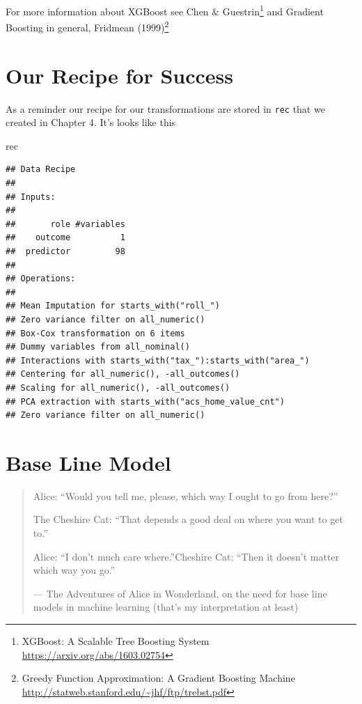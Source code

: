 \documentclass[]{book}
\newenvironment{Shaded}{\begin{snugshade}}{\end{snugshade}}
\newcommand{\NormalTok}[1]{#1}
\let\rmarkdownfootnote\footnote%
\def\footnote{\protect\rmarkdownfootnote}
\theoremstyle{definition}
\theoremstyle{definition}
\theoremstyle{definition}
\theoremstyle{remark}
\begin{document}
For more information about XGBoost see Chen \& Guestrin\footnote{XGBoost:
  A Scalable Tree Boosting System \url{https://arxiv.org/abs/1603.02754}}
and Gradient Boosting in general, Fridmean (1999)\footnote{Greedy
  Function Approximation: A Gradient Boosting Machine
  \url{http://statweb.stanford.edu/~jhf/ftp/trebst.pdf}}

\section{Our Recipe for Success}\label{our-recipe-for-success}

As a reminder our recipe for our transformations are stored in
\texttt{rec} that we created in Chapter 4. It's looks like this

\begin{Shaded}
\begin{Highlighting}[]
\NormalTok{rec}
\end{Highlighting}
\end{Shaded}

\begin{verbatim}
## Data Recipe
## 
## Inputs:
## 
##       role #variables
##    outcome          1
##  predictor         98
## 
## Operations:
## 
## Mean Imputation for starts_with("roll_")
## Zero variance filter on all_numeric()
## Box-Cox transformation on 6 items
## Dummy variables from all_nominal()
## Interactions with starts_with("tax_"):starts_with("area_")
## Centering for all_numeric(), -all_outcomes()
## Scaling for all_numeric(), -all_outcomes()
## PCA extraction with starts_with("acs_home_value_cnt")
## Zero variance filter on all_numeric()
\end{verbatim}

\section{Base Line Model}\label{base-line-model}

\begin{quote}
Alice: ``Would you tell me, please, which way I ought to go from here?''

The Cheshire Cat: ``That depends a good deal on where you want to get
to.''

Alice: ``I don't much care where.''\nThe Cheshire Cat: ``Then it doesn't
matter which way you go.''

--- The Adventures of Alice in Wonderland, on the need for base line
models in machine learning (that's my interpretation at least)
\end{quote}
\end{document}
